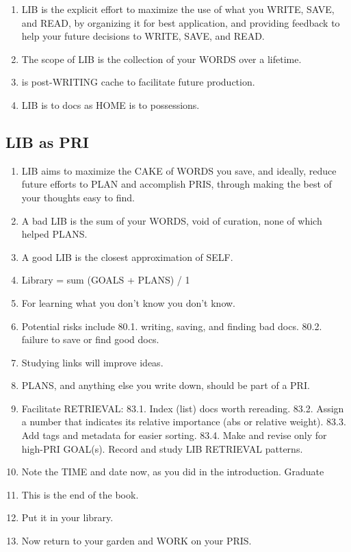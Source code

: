 \documentclass[
]{book}
\providecommand{\tightlist}{%
  \setlength{\itemsep}{0pt}\setlength{\parskip}{0pt}}
\begin{document}
\begin{enumerate}
\def\labelenumi{\arabic{enumi}.}
\setcounter{enumi}{70}
\tightlist
\item
  LIB is the explicit effort to maximize the use of what you WRITE, SAVE,
  and READ, by organizing it for best application, and providing feedback
  to help your future decisions to WRITE, SAVE, and READ.
\item
  The scope of LIB is the collection of your WORDS over a lifetime.
\item
  is post-WRITING cache to facilitate future production.
\item
  LIB is to docs as HOME is to possessions.
\end{enumerate}

\hypertarget{lib-as-pri}{%
\subsection{LIB as PRI}\label{lib-as-pri}}

\begin{enumerate}
\def\labelenumi{\arabic{enumi}.}
\setcounter{enumi}{74}
\tightlist
\item
  LIB aims to maximize the CAKE of WORDS you save, and ideally,
  reduce future efforts to PLAN and accomplish PRIS, through making
  the best of your thoughts easy to find.
\item
  A bad LIB is the sum of your WORDS, void of curation, none of which
  helped PLANS.
\item
  A good LIB is the closest approximation of SELF.
\item
  Library = sum (GOALS + PLANS) / 1
\item
  For learning what you don't know you don't know.
\item
  Potential risks include
  80.1. writing, saving, and finding bad docs.
  80.2. failure to save or find good docs.
\item
  Studying links will improve ideas.
\item
  PLANS, and anything else you write down, should be part of a PRI.
\item
  Facilitate RETRIEVAL:
  83.1. Index (list) docs worth rereading.
  83.2. Assign a number that indicates its relative importance (abs or
  relative weight).
  83.3. Add tags and metadata for easier sorting.
  83.4. Make and revise only for high-PRI GOAL(s). Record and study LIB
  RETRIEVAL patterns.
\item
  Note the TIME and date now, as you did in the introduction.
  Graduate
\item
  This is the end of the book.
\item
  Put it in your library.
\item
  Now return to your garden and WORK on your PRIS.
\end{enumerate}
\end{document}
